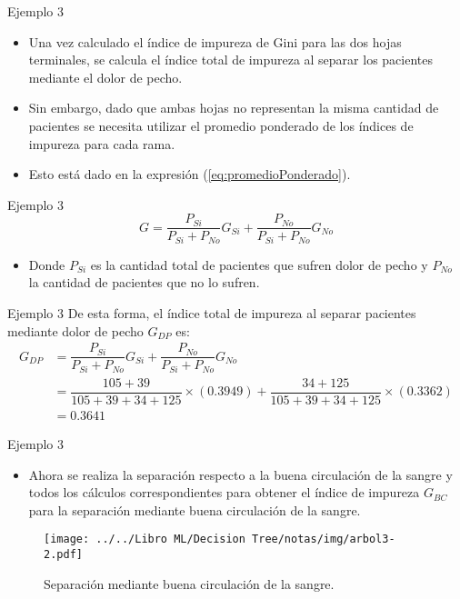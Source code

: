 \documentclass[11pt,aspectratio=169]{beamer}
\begin{document}
\begin{frame}{Ejemplo 3}
	\begin{itemize}
		\item Una vez calculado el índice de impureza de Gini para las dos hojas terminales, 
			se calcula el índice total de impureza al separar los pacientes mediante el dolor de pecho.\pause
		\item Sin embargo, dado que ambas hojas no representan la misma cantidad de pacientes se necesita 
			utilizar el promedio ponderado de los índices de impureza para cada rama.\pause 
		\item Esto está dado en la expresión (\ref{eq:promedioPonderado}).
	\end{itemize}
\end{frame}

\begin{frame}{Ejemplo 3}
	\begin{equation}
		G = \dfrac{P_{Si}}{P_{Si} + P_{No}}G_{Si} + \dfrac{P_{No}}{P_{Si}+P_{No}}G_{No}
		\label{eq:promedioPonderado}
	\end{equation}
	\begin{itemize}
		\item Donde $P_{Si}$ es la cantidad total de pacientes que sufren dolor de pecho y $P_{No}$ la cantidad de pacientes que no lo sufren. 
	\end{itemize}
\end{frame}

\begin{frame}{Ejemplo 3}
	De esta forma, el índice total de impureza al separar pacientes mediante dolor de pecho $G_{DP}$ es:\pause
	\begin{align*}
		G_{DP} &= \dfrac{P_{Si}}{P_{Si} + P_{No}}G_{Si} + \dfrac{P_{No}}{P_{Si}+P_{No}}G_{No} \\
			&= \dfrac{105+39}{105+39+34+125}\times (0.3949) + \dfrac{34+125}{105+39+34+125}\times (0.3362) \\
			&= 0.3641
	\end{align*}		
\end{frame}

\begin{frame}{Ejemplo 3}
	\begin{itemize}
		\item Ahora se realiza la separación respecto a la buena circulación de la sangre y todos los cálculos 
		correspondientes para obtener el índice de impureza $G_{BC}$ para la separación mediante buena 
		circulación de la sangre.
	\end{itemize}\pause

\begin{figure}[H]
	\centering
	\texttt{[image: ../../Libro ML/Decision Tree/notas/img/arbol3-2.pdf]}
	\caption{Separación mediante buena circulación de la sangre.}
	\label{fig:arbol3-2}
\end{figure}
\end{frame}
\end{document}
